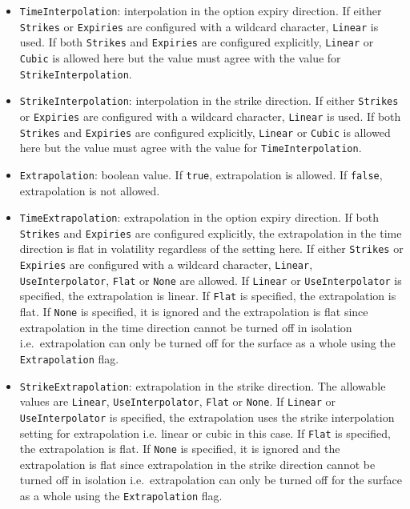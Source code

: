 \documentclass[12pt, a4paper]{article}
\begin{document}
{{\begin{itemize}
\item
\lstinline!TimeInterpolation!: interpolation in the option expiry direction. If either \lstinline!Strikes! or \lstinline!Expiries! are configured with a wildcard character, \lstinline!Linear! is used. If both \lstinline!Strikes! and \lstinline!Expiries! are configured explicitly, \lstinline!Linear! or \lstinline!Cubic! is allowed here but the value must agree with the value for \lstinline!StrikeInterpolation!.

\item
\lstinline!StrikeInterpolation!: interpolation in the strike direction. If either \lstinline!Strikes! or \lstinline!Expiries! are configured with a wildcard character, \lstinline!Linear! is used. If both \lstinline!Strikes! and \lstinline!Expiries! are configured explicitly, \lstinline!Linear! or \lstinline!Cubic! is allowed here but the value must agree with the value for \lstinline!TimeInterpolation!.

\item
\lstinline!Extrapolation!: boolean value. If \lstinline!true!, extrapolation is allowed. If \lstinline!false!, extrapolation is not allowed.

\item
\lstinline!TimeExtrapolation!: extrapolation in the option expiry direction. If both \lstinline!Strikes! and \lstinline!Expiries! are configured explicitly, the extrapolation in the time direction is flat in volatility regardless of the setting here. If either \lstinline!Strikes! or \lstinline!Expiries! are configured with a wildcard character, \lstinline!Linear!, \lstinline!UseInterpolator!, \lstinline!Flat! or \lstinline!None! are allowed. If \lstinline!Linear! or \lstinline!UseInterpolator! is specified, the extrapolation is linear. If \lstinline!Flat! is specified, the extrapolation is flat. If \lstinline!None! is specified, it is ignored and the extrapolation is flat since extrapolation in the time direction cannot be turned off in isolation i.e.\ extrapolation can only be turned off for the surface as a whole using the \lstinline!Extrapolation! flag.

\item
\lstinline!StrikeExtrapolation!: extrapolation in the strike direction. The allowable values are \lstinline!Linear!, \lstinline!UseInterpolator!, \lstinline!Flat! or \lstinline!None!. If \lstinline!Linear! or \lstinline!UseInterpolator! is specified, the extrapolation uses the strike interpolation setting for extrapolation i.e. linear or cubic in this case. If \lstinline!Flat! is specified, the extrapolation is flat. If \lstinline!None! is specified, it is ignored and the extrapolation is flat since extrapolation in the strike direction cannot be turned off in isolation i.e.\ extrapolation can only be turned off for the surface as a whole using the \lstinline!Extrapolation! flag.


\end{itemize}}}
\end{document}
